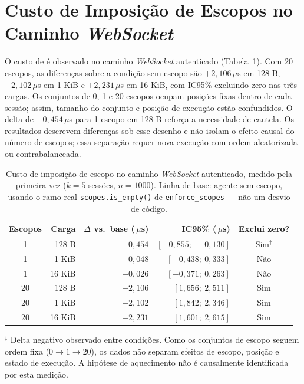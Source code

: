 \documentclass[12pt,openright,twoside,a4paper,english,brazil]{abntex2}
\newcommand{\micro}{\,$\mu$s}
\begin{document}
\section{Custo de Imposição de Escopos no Caminho \textit{WebSocket}}
\label{sec:custo-escopos}
O custo de  é observado no caminho \textit{WebSocket} autenticado (Tabela~\ref{tab:enforce-scopes}). Com 20 escopos, as diferenças sobre a condição sem escopo são $+2{,}106$\micro{} em 128 B, $+2{,}102$\micro{} em 1 KiB e $+2{,}231$\micro{} em 16 KiB, com IC95\% excluindo zero nas três cargas. Os conjuntos de 0, 1 e 20 escopos ocupam posições fixas dentro de cada sessão; assim, tamanho do conjunto e posição de execução estão confundidos. O delta de $-0{,}454$\micro{} para 1 escopo em 128 B reforça a necessidade de cautela. Os resultados descrevem diferenças sob esse desenho e não isolam o efeito causal do número de escopos; essa separação requer nova execução com ordem aleatorizada ou contrabalanceada.

\begin{table}[htb]
\centering
\caption{Custo de imposição de escopo no caminho \textit{WebSocket} autenticado, medido pela primeira vez ($k=5$ sessões, $n=1000$). Linha de base: agente sem escopo, usando o ramo real \texttt{scopes.is\_empty()} de \texttt{enforce\_scopes} --- não um desvio de código.}
\label{tab:enforce-scopes}
\begin{tabular}{crrrc}
\toprule
Escopos & Carga & $\Delta$ vs.\ base (\micro) & IC95\% (\micro) & Exclui zero? \\
\midrule
1  & 128 B  & $-0{,}454$ & $[-0{,}855;\ -0{,}130]$ & Sim$^{\ddagger}$ \\
1  & 1 KiB  & $-0{,}048$ & $[-0{,}438;\ 0{,}333]$  & Não \\
1  & 16 KiB & $-0{,}026$ & $[-0{,}371;\ 0{,}263]$  & Não \\
20 & 128 B  & $+2{,}106$ & $[1{,}656;\ 2{,}511]$   & Sim \\
20 & 1 KiB  & $+2{,}102$ & $[1{,}842;\ 2{,}346]$   & Sim \\
20 & 16 KiB & $+2{,}231$ & $[1{,}601;\ 2{,}615]$   & Sim \\
\bottomrule
\end{tabular}

\vspace{2pt}
\footnotesize
$^{\ddagger}$ Delta negativo observado entre condições. Como os conjuntos de escopo seguem ordem fixa ($0 \rightarrow 1 \rightarrow 20$), os dados não separam efeitos de escopo, posição e estado de execução. A hipótese de aquecimento não é causalmente identificada por esta medição.

\end{table}
\end{document}
